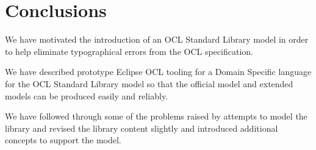 \documentclass{eceasst}
\begin{document}
\section{Conclusions}

We have motivated the introduction of an OCL Standard Library model in order to help eliminate typographical errors from the OCL specification.

We have described prototype Eclipse OCL tooling for a Domain Specific language for the OCL Standard Library model so that the official model and extended models can be produced easily and reliably.

We have followed through some of the problems raised by attempts to model the library and revised the library content slightly and introduced additional concepts to support the model.




\nocite{*}


\end{document}
